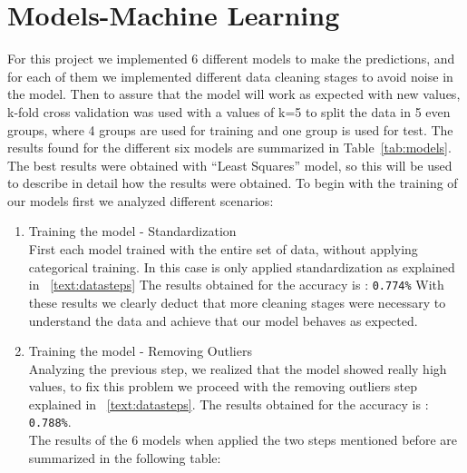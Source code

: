 \documentclass[10pt,conference,compsocconf]{IEEEtran}
\begin{document}
\section{Models-Machine Learning}
For this project we implemented 6 different models to make the predictions, 
and for each of them we implemented different data cleaning stages
to avoid noise in the model. Then to assure that the model will work as 
expected with new values, k-fold cross validation was used with a values of
k=5 to split the data in 5 even groups, where 4 groups are used for training 
and one group is used for test. 
The results found for the different six models are summarized in Table~\ref{tab:models}.
The best results were obtained with ``Least Squares'' model, so this will
be used to describe in detail how the results were obtained.
To begin with the training of our models first we analyzed different scenarios: 

\begin{enumerate}
\item Training the model - Standardization \\
First each model trained with the entire set of data, without applying categorical 
training. In this case is only applied standardization as explained in ~\ref{text:datasteps}
The results obtained for the accuracy is :  \texttt{0.774\%}
With these results we clearly deduct that more cleaning stages were necessary to understand
the data and achieve that our model behaves as expected.
\item Training the model - Removing Outliers \\
Analyzing the previous step, we realized that the model showed really high values, to fix
this problem we proceed with the removing outliers step explained in ~\ref{text:datasteps}.
The results obtained for the accuracy is :  \texttt{0.788\%}.\\
The results of the 6  models when applied the two steps mentioned before are summarized in 
the following table:
\end{enumerate}
\end{document}
